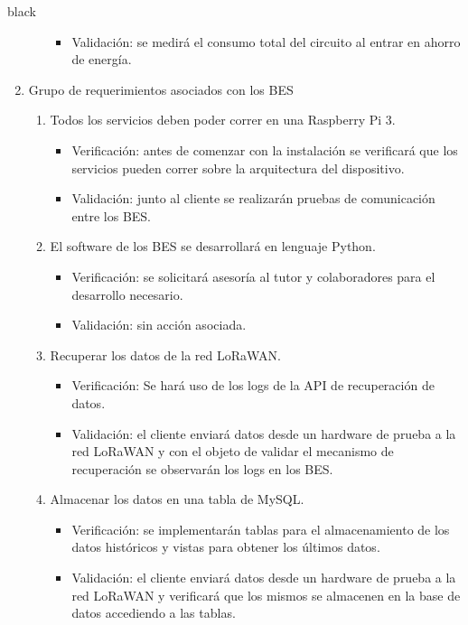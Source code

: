 \documentclass[11pt]{charter}
\begin{document}
\begin{consigna}{black}
\begin{enumerate}
\begin{enumerate}[label*=\arabic*.]
\begin{itemize}
					\item Validación: se medirá el consumo total del circuito al entrar en ahorro de energía.\\
				\end{itemize}
		\end{enumerate}
	\item Grupo de requerimientos asociados con los BES
		\begin{enumerate}[label*=\arabic*.]
			\item Todos los servicios deben poder correr en una Raspberry Pi 3.
			\begin{itemize}
				\item Verificación: antes de comenzar con la instalación se verificará que los servicios pueden correr sobre la arquitectura del dispositivo.\\
				\item Validación: junto al cliente se realizarán pruebas de comunicación entre los BES.\\
			\end{itemize}
			
			\item El software de los BES se desarrollará en lenguaje Python.
			\begin{itemize}
				\item Verificación: se solicitará asesoría al tutor y colaboradores para el desarrollo necesario.\\
				\item Validación: sin acción asociada.\\
			\end{itemize}
			
			\item Recuperar los datos de la red LoRaWAN.
			\begin{itemize}
				\item Verificación: Se hará uso de los logs de la API de recuperación de datos.\\
				\item Validación: el cliente enviará datos desde un hardware de prueba a la red LoRaWAN y con el objeto de validar el mecanismo de recuperación se observarán los logs en los BES.\\
			\end{itemize}

			\item Almacenar los datos en una tabla de MySQL.
			\begin{itemize}
				\item Verificación: se implementarán tablas para el almacenamiento de los datos históricos y vistas para obtener los últimos datos.\\
				\item Validación: el cliente enviará datos desde un hardware de prueba a la red LoRaWAN y verificará que los mismos se almacenen en la base de datos accediendo a las tablas.\\
			\end{itemize}
			

\end{enumerate}
\end{enumerate}
\end{consigna}
\end{document}
